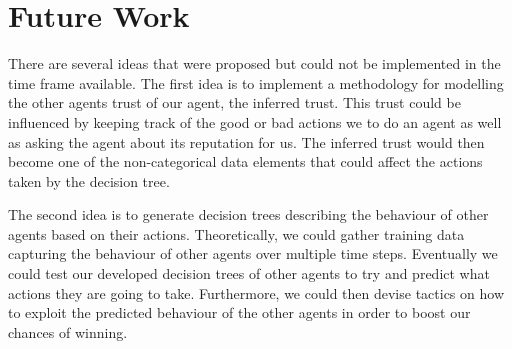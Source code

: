 \section{Future Work}
There are several ideas that were proposed but could not be implemented
in the time frame available.  The first idea is to implement a
methodology for modelling the other agents trust of our agent, the
inferred trust.  This trust could be influenced by keeping track of the
good or bad actions we to do an agent as well as asking the agent about
its reputation for us.  The inferred trust would then become one of the
non-categorical data elements that could affect the actions taken by
the decision tree.

The second idea is to generate decision trees describing the behaviour
of other agents based on their actions.  Theoretically, we could gather
training data capturing the behaviour of other agents over multiple
time steps.  Eventually we could test our developed decision trees of 
other agents to try and predict what actions they are going to take.
Furthermore, we could then devise tactics on how to exploit the 
predicted behaviour of the other agents in order to boost our chances of
winning.
